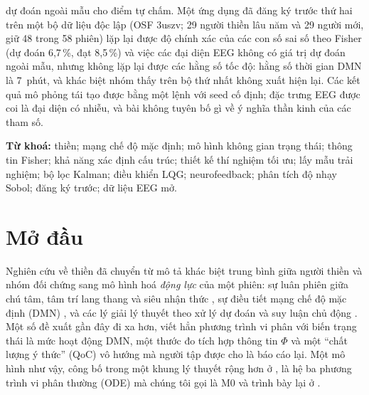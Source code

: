 \begin{tcolorbox}[mathbox,title=Tóm tắt]
dự đoán ngoài mẫu cho điểm tự chấm. Một ứng dụng đã đăng ký trước thứ hai trên một bộ dữ liệu độc lập (OSF 3uszv; 29 người thiền lâu năm và 29 người mới, giữ 48 trong 58 phiên) lặp lại được độ chính xác của các con số sai số theo Fisher (dự đoán 6,7\,\%, đạt 8,5\,\%) và việc các đại diện EEG không có giá trị dự đoán ngoài mẫu, nhưng không lặp lại được các hằng số tốc độ: hằng số thời gian DMN là 7~phút, và khác biệt nhóm thấy trên bộ thứ nhất không xuất hiện lại. Các kết quả mô phỏng tái tạo được bằng một lệnh với seed cố định; đặc trưng EEG được coi là đại diện có nhiễu, và bài không tuyên bố gì về ý nghĩa thần kinh của các tham số.
\end{tcolorbox}

\noindent\textbf{Từ khoá:} thiền; mạng chế độ mặc định; mô hình không gian trạng thái; thông tin Fisher; khả năng xác định cấu trúc; thiết kế thí nghiệm tối ưu; lấy mẫu trải nghiệm; bộ lọc Kalman; điều khiển LQG; neurofeedback; phân tích độ nhạy Sobol; đăng ký trước; dữ liệu EEG mở.

\section{Mở đầu}
\label{sec:intro}

Nghiên cứu về thiền đã chuyển từ mô tả khác biệt trung bình giữa người thiền và nhóm đối chứng \citep{Brewer2011,Fox2016} sang mô hình hoá \emph{động lực} của một phiên: sự luân phiên giữa chú tâm, tâm trí lang thang và siêu nhận thức \citep{Hasenkamp2012,Lutz2008,Christoff2016}, sự điều tiết mạng chế độ mặc định (DMN) \citep{Raichle2001,Brewer2011,Garrison2015}, và các lý giải lý thuyết theo xử lý dự đoán và suy luận chủ động \citep{Laukkonen2021,SandvedSmith2021}. Một số đề xuất gần đây đi xa hơn, viết hẳn phương trình vi phân với biến trạng thái là mức hoạt động DMN, một thước đo tích hợp thông tin $\Phi$ \citep{Tononi2004,Oizumi2014} và một ``chất lượng ý thức'' (QoC) vô hướng mà người tập được cho là báo cáo lại. Một mô hình như vậy, công bố trong một khung lý thuyết rộng hơn ở \citet{BQI}, là hệ ba phương trình vi phân thường (ODE) mà chúng tôi gọi là M0 và trình bày lại ở .

